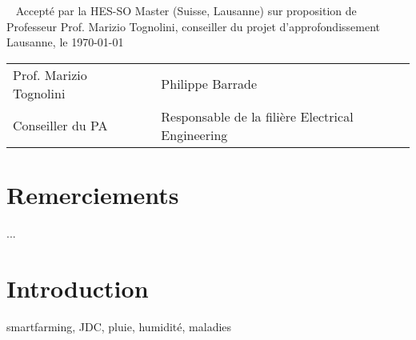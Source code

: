 \documentclass[a4paper, french, 10pt]{article} %
\newcommand{\prof}{Prof. Marizio Tognolini}
\begin{document}


\newpage
\thispagestyle{empty}
\
\newpage
\thispagestyle{empty}
Accepté par la HES-SO Master (Suisse, Lausanne) sur proposition de\\[10pt]
Professeur \prof, conseiller du projet d'approfondissement\\[30pt]
Lausanne, le \today\\[40pt]

\begin{tabular}{lll}
\prof & \hspace{4cm} & Philippe Barrade\\
Conseiller du PA & \hspace{4cm} & Responsable de la filière Electrical Engineering\\
\end{tabular}

\newpage
\thispagestyle{empty}
\section*{Remerciements}
...

\newpage
\thispagestyle{empty}
\tableofcontents

\newpage

\section{Introduction}
smartfarming, JDC, pluie, humidité, maladies





\end{document}
